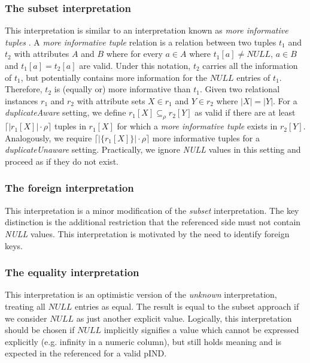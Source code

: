 \subsubsection{The \textbf{subset} interpretation}\label{sec:null_subset} This interpretation is similar to an interpretation known as \textit{more informative tuples} \cite{zaniolo1982database}. A \textit{more informative tuple} relation is a relation between two tuples $t_1$ and $t_2$ with attributes $A$ and $B$ where for every $a \in A$ where $t_1[a] \not = NULL$, $a \in B$ and $t_1[a] = t_2[a]$ are valid. Under this notation, $t_2$ carries all the information of $t_1$, but potentially contains more information for the $NULL$ entries of $t_1$. Therefore, $t_2$ is (equally or) more informative than $t_1$. Given two relational instances $r_1$ and $r_2$ with attribute sets $X \in r_1$ and $Y \in r_2$ where $|X| = |Y|$. For a \textit{duplicateAware} setting, we define $r_1[X] \subseteq_\rho r_2[Y]$ as valid if there are at least $\lceil |r_1[X]| \cdot \rho \rceil$ tuples in $r_1[X]$ for which a \textit{more informative tuple} exists in $r_2[Y]$. Analogously, we require $\lceil |\{r_1[X]\}| \cdot \rho \rceil$ more informative tuples for a \textit{duplicateUnaware} setting. Practically, we ignore \textit{NULL} values in this setting and proceed as if they do not exist.

\subsubsection{The \textbf{foreign} interpretation}
This interpretation is a minor modification of the \textit{subset} interpretation. The key distinction is the additional restriction that the referenced side must not contain \textit{NULL} values. This interpretation is motivated by the need to identify foreign keys.

\subsubsection{The \textbf{equality} interpretation}
This interpretation is an optimistic version of the \textit{unknown} interpretation, treating all $NULL$ entries as equal. The result is equal to the subset approach if we consider $NULL$ as just another explicit value. Logically, this interpretation should be chosen if $NULL$ implicitly signifies a value which cannot be expressed explicitly (e.g. infinity in a numeric column), but still holds meaning and is expected in the referenced for a valid pIND.

